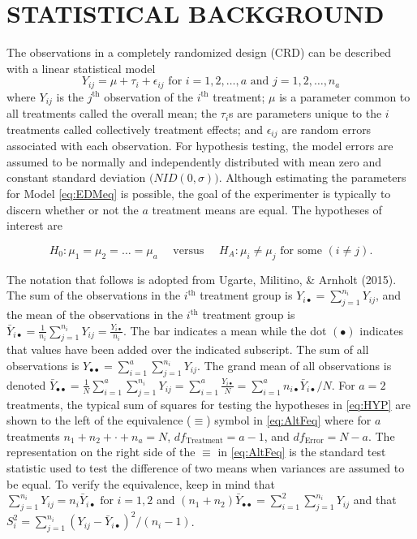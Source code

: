 \documentclass[
]{article}
\begin{document}
\hypertarget{statistical-background}{%
\section*{STATISTICAL BACKGROUND}\label{statistical-background}}

The observations in a completely randomized design (CRD) can be described with a linear statistical model
\begin{equation}
Y_{ij} = \mu + \tau_i + \epsilon_{ij} \text{ for }i=1, 2, \dots, a \text{ and } j
=1, 2, \dots, n_a
\label{eq:EDMeq}
\end{equation}
where \(Y_{ij}\) is the \(j^\text{th}\)
observation of the \(i^\text{th}\) treatment; \(\mu\) is a parameter common to all treatments called the overall mean; the \(\tau_i\)s are parameters unique to the \(i\) treatments called collectively treatment effects; and \(\epsilon_{ij}\) are random errors associated with each observation. For hypothesis testing, the model errors are assumed to be normally and independently distributed with mean zero and constant standard deviation \(\bigl(NID(0, \sigma)\bigr)\). Although estimating the parameters for Model \eqref{eq:EDMeq} is possible, the goal of the experimenter is typically to discern whether or not the \(a\) treatment means are equal. The hypotheses of interest are

\begin{equation}
H_0: \mu_1=\mu_2= \dots = \mu_a\quad\text{ versus }\quad H_A:\mu_i \ne \mu_j \text{ for some }(i \neq j).
\label{eq:HYP}
\end{equation}

The notation that follows is adopted from Ugarte, Militino, \& Arnholt (2015). The sum of the observations in the \(i^\text{th}\) treatment group is \(Y_{i\bullet}=\sum_{j=1}^{n_i} Y_{ij}\), and the mean of the observations in the \(i^\text{th}\) treatment group is \(\bar{Y}_{i\bullet}=\frac{1}{n_{i}}\sum_{j=1}^{n_i} Y_{ij} = \frac{Y_{i\bullet}}{n_i}\). The bar indicates a mean while the dot \((\bullet)\) indicates that values have been added over the indicated subscript. The sum of all observations is \(Y_{\bullet\bullet}=\sum_{i=1}^a \sum_{j=1}^{n_i}Y_{ij}.\) The grand mean of all observations is denoted \(\bar{Y}_{\bullet\bullet}=\frac{1}{N}\sum_{i=1}^a \sum_{j=1}^{n_i}Y_{ij}=\sum_{i=1}^{a}\frac{Y_{i\bullet}}{N} =\sum_{i=1}^{a}n_{i\bullet}\bar{Y}_{i\bullet}/N.\) For \(a = 2\) treatments, the typical sum of squares for testing the hypotheses in \eqref{eq:HYP} are shown to the left of the equivalence (\(\equiv\)) symbol in \eqref{eq:AltFeq} where for \(a\) treatments \(n_1 + n_2 + \cdot + n_a = N\), \(df_{\text{Treatment}} = a - 1\), and \(df_{\text{Error}} = N-a\). The representation on the right side of the \(\equiv\) in \eqref{eq:AltFeq} is the standard test statistic used to test the difference of two means when variances are assumed to be equal. To verify the equivalence, keep in mind that \(\sum_{j=1}^{n_i} Y_{ij} = n_i \bar{Y}_{i\bullet} \text{ for } i=1,2\) and \((n_1 + n_2) \bar{Y}_{\bullet\bullet} = \sum_{i=1}^2 \sum_{j=1}^{n_i} Y_{ij}\) and that \(S_i^2 =\sum_{j=1}^{n_i}(Y_{ij} - \bar{Y}_{i\bullet})^2/(n_i - 1)\).
\end{document}
